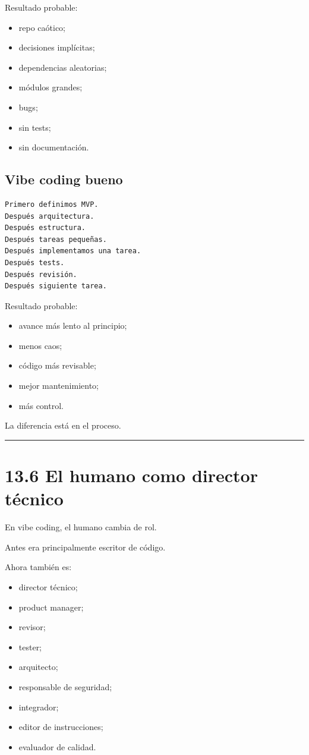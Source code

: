 Resultado probable:

\begin{itemize}
\tightlist
\item
  repo caótico;
\item
  decisiones implícitas;
\item
  dependencias aleatorias;
\item
  módulos grandes;
\item
  bugs;
\item
  sin tests;
\item
  sin documentación.
\end{itemize}

\subsection{Vibe coding bueno}\label{vibe-coding-bueno}

\begin{lstlisting}
Primero definimos MVP.
Después arquitectura.
Después estructura.
Después tareas pequeñas.
Después implementamos una tarea.
Después tests.
Después revisión.
Después siguiente tarea.
\end{lstlisting}

Resultado probable:

\begin{itemize}
\tightlist
\item
  avance más lento al principio;
\item
  menos caos;
\item
  código más revisable;
\item
  mejor mantenimiento;
\item
  más control.
\end{itemize}

La diferencia está en el proceso.

\begin{center}\rule{0.5\linewidth}{0.5pt}\end{center}

\section{13.6 El humano como director
técnico}\label{el-humano-como-director-tuxe9cnico}

En vibe coding, el humano cambia de rol.

Antes era principalmente escritor de código.

Ahora también es:

\begin{itemize}
\tightlist
\item
  director técnico;
\item
  product manager;
\item
  revisor;
\item
  tester;
\item
  arquitecto;
\item
  responsable de seguridad;
\item
  integrador;
\item
  editor de instrucciones;
\item
  evaluador de calidad.
\end{itemize}

